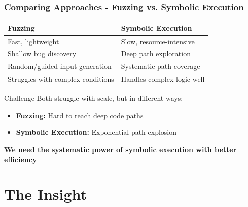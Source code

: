 \documentclass[aspectratio=169]{beamer}
\begin{document}
\begin{frame}
    \frametitle{Comparing Approaches - Fuzzing vs. Symbolic Execution}
    \begin{table}[]
        \centering
        \begin{tabular}{@{}ll@{}}
        \toprule
        \textbf{Fuzzing} & \textbf{Symbolic Execution} \\
        \midrule
        Fast, lightweight & Slow, resource-intensive \\
        Shallow bug discovery & Deep path exploration \\
        Random/guided input generation & Systematic path coverage \\
        Struggles with complex conditions & Handles complex logic well \\
        \bottomrule
        \end{tabular}
    \end{table}
    
    \begin{research}{Challenge}
        Both struggle with scale, but in different ways:
        \begin{itemize}
            \item \textbf{Fuzzing:} Hard to reach deep code paths
            \item \textbf{Symbolic Execution:} Exponential path explosion
        \end{itemize}
    \end{research}
    
    \begin{center}
        \textbf{We need the systematic power of symbolic execution with better efficiency}
    \end{center}
\end{frame}

\section{The Insight}
\end{document}
